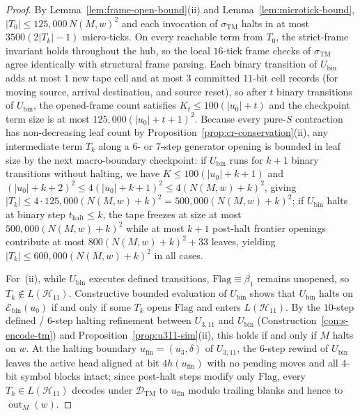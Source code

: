\documentclass[11pt,reqno]{amsart}
\numberwithin{equation}{section}
\theoremstyle{plain}
\theoremstyle{definition}
\theoremstyle{remark}
\DeclareMathOperator{\out}{out}
\begin{document}
\begin{proof}
By Lemma~\ref{lem:frame-open-bound}(ii) and Lemma~\ref{lem:microtick-bound}, $|T_0| \le 125{,}000\,N(M,w)^2$ and each invocation of $\sigma_{\mathrm{TM}}$ halts in at most $3500(2|T_k|-1)$ micro-ticks. On every reachable term from $T_0$, the strict-frame invariant holds throughout the hub, so the local $16$-tick frame checks of $\sigma_{\mathrm{TM}}$ agree identically with structural frame parsing. Each binary transition of $U_{\mathrm{bin}}$ adds at most $1$ new tape cell and at most $3$ committed $11$-bit cell records (for moving source, arrival destination, and source reset), so after $t$ binary transitions of $U_{\mathrm{bin}}$, the opened-frame count satisfies $K_t \le 100(|u_0| + t)$ and the checkpoint term size is at most $125{,}000(|u_0| + t + 1)^2$. Because every pure-$S$ contraction has non-decreasing leaf count by Proposition~\ref{prop:cr-conservation}(ii), any intermediate term $T_k$ along a $6$- or $7$-step generator opening is bounded in leaf size by the next macro-boundary checkpoint: if $U_{\mathrm{bin}}$ runs for $k+1$ binary transitions without halting, we have $K \le 100(|u_0| + k + 1)$ and $(|u_0| + k + 2)^2 \le 4(|u_0| + k + 1)^2 \le 4(N(M,w) + k)^2$, giving $|T_k| \le 4 \cdot 125{,}000(N(M,w)+k)^2 = 500{,}000(N(M,w)+k)^2$; if $U_{\mathrm{bin}}$ halts at binary step $t_{\mathrm{halt}} \le k$, the tape freezes at size at most $500{,}000(N(M,w)+k)^2$ while at most $k+1$ post-halt frontier openings contribute at most $800(N(M,w)+k)^2 + 33$ leaves, yielding $|T_k| \le 600{,}000(N(M,w)+k)^2$ in all cases.

For~(ii), while $U_{\mathrm{bin}}$ executes defined transitions, $\mathrm{Flag} \equiv \beta_1$ remains unopened, so $T_k \notin L(\mathcal{H}_{11})$. Constructive bounded evaluation of $U_{\mathrm{bin}}$ shows that $U_{\mathrm{bin}}$ halts on $\mathcal{E}_{\mathrm{bin}}(u_0)$ if and only if some $T_k$ opens $\mathrm{Flag}$ and enters $L(\mathcal{H}_{11})$. By the $10$-step defined / $6$-step halting refinement between $U_{3,11}$ and $U_{\mathrm{bin}}$ (Construction~\ref{con:s-encode-tm}) and Proposition~\ref{prop:u311-sim}(ii), this holds if and only if $M$ halts on $w$. At the halting boundary $u_{\mathrm{fin}} = (u_3, \delta)$ of $U_{3,11}$, the $6$-step rewind of $U_{\mathrm{bin}}$ leaves the active head aligned at bit $4 h(u_{\mathrm{fin}})$ with no pending moves and all $4$-bit symbol blocks intact; since post-halt steps modify only $\mathrm{Flag}$, every $T_k \in L(\mathcal{H}_{11})$ decodes under $\mathcal{D}_{\mathrm{TM}}$ to $u_{\mathrm{fin}}$ modulo trailing blanks and hence to $\out_M(w)$.
\end{proof}
\end{document}
